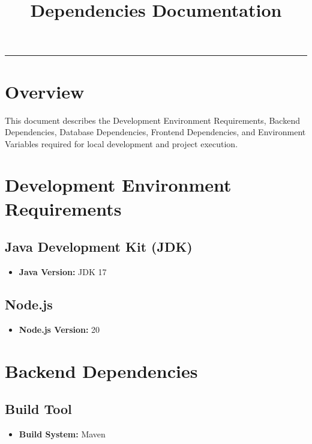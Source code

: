 \documentclass[a4paper,11pt]{article}
\title{Dependencies Documentation}
\date{}
\begin{document}
\maketitle
\hrule
\vspace{1em}

\section{Overview}

This document describes the Development Environment Requirements, Backend Dependencies, Database Dependencies, Frontend Dependencies, and Environment Variables required for local development and project execution.  


\section{Development Environment Requirements}

\subsection{Java Development Kit (JDK)}
\begin{itemize}
    \item \textbf{Java Version:} JDK 17
\end{itemize}

\subsection{Node.js}
\begin{itemize}
    \item \textbf{Node.js Version:} 20
\end{itemize}

\section{Backend Dependencies}

\subsection{Build Tool}
\begin{itemize}
    \item \textbf{Build System:} Maven
\end{itemize}
\end{document}
